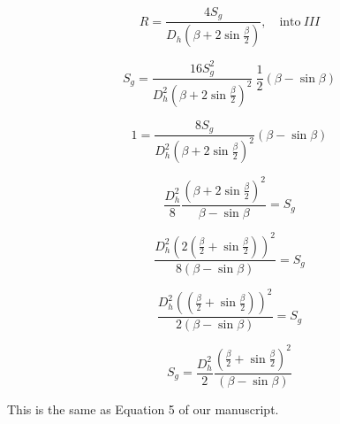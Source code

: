 \documentclass[11pt]{article}
\begin{document}
\begin{itemize}
  \begin{equation}
    R = \frac{4S_g}{D_h (\beta +2 \sin \frac{\beta}{2})}, \quad \mathrm{into~} III 
  \end{equation}

  
  \begin{equation}
    S_g = \frac{16 S_g^2}{D_h^2 (\beta +2\sin\frac{\beta}{2})^2} ~\frac{1}{2}(\beta-\sin\beta)
  \end{equation}

  
  \begin{equation}
    1 = \frac{8 S_g}{D_h^2 (\beta +2\sin\frac{\beta}{2})^2} (\beta-\sin\beta)
  \end{equation}


  \begin{equation}
    \frac{D_h^2}{8} \frac{(\beta+2\sin\frac{\beta}{2})^2}{\beta - \sin \beta} = S_g
  \end{equation}

  \begin{equation}
    \frac{D_h^2 (2(\frac{\beta}{2}+\sin \frac{\beta}{2}))^2}{8(\beta - \sin \beta)} = S_g
  \end{equation}


   \begin{equation}
    \frac{D_h^2 ((\frac{\beta}{2}+\sin \frac{\beta}{2}))^2}{2(\beta - \sin \beta)} = S_g
  \end{equation}


  \begin{equation}
       S_g = \frac{D_h^2}{2} \frac{(\frac{\beta}{2}+\sin \frac{\beta}{2})^2}{(\beta - \sin \beta)}  
  \end{equation}

  This is the same as Equation 5 of our manuscript.

  

\end{itemize}

 

\end{document}
